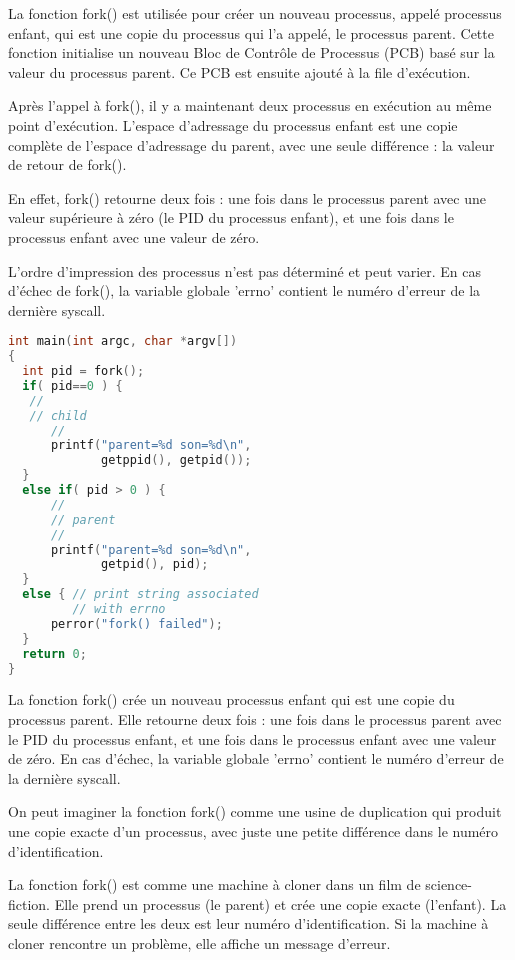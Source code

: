 \documentclass[12pt]{report}
\begin{document}
 La fonction fork() est utilisée pour créer un nouveau processus, appelé processus enfant, qui est une copie du processus qui l'a appelé, le processus parent. Cette fonction initialise un nouveau Bloc de Contrôle de Processus (PCB) basé sur la valeur du processus parent. Ce PCB est ensuite ajouté à la file d'exécution. 

 Après l'appel à fork(), il y a maintenant deux processus en exécution au même point d'exécution. L'espace d'adressage du processus enfant est une copie complète de l'espace d'adressage du parent, avec une seule différence : la valeur de retour de fork(). 

 En effet, fork() retourne deux fois : une fois dans le processus parent avec une valeur supérieure à zéro (le PID du processus enfant), et une fois dans le processus enfant avec une valeur de zéro. 

 L'ordre d'impression des processus n'est pas déterminé et peut varier. En cas d'échec de fork(), la variable globale 'errno' contient le numéro d'erreur de la dernière syscall. 


\begin{lstlisting}[language=C]
int main(int argc, char *argv[])
{
  int pid = fork();
  if( pid==0 ) { 
   //
   // child
      //
      printf("parent=%d son=%d\n",
             getppid(), getpid());
  }
  else if( pid > 0 ) {
      //
      // parent
      //
      printf("parent=%d son=%d\n",
             getpid(), pid);
  }
  else { // print string associated
         // with errno   
      perror("fork() failed"); 
  }
  return 0;
}
\end{lstlisting}

\begin{tcolorbox}[colback=yellow!5, colframe=yellow!80!black, title={\faBookmark À retenir}]
La fonction fork() crée un nouveau processus enfant qui est une copie du processus parent. Elle retourne deux fois : une fois dans le processus parent avec le PID du processus enfant, et une fois dans le processus enfant avec une valeur de zéro. En cas d'échec, la variable globale 'errno' contient le numéro d'erreur de la dernière syscall.
\end{tcolorbox}

\begin{tcolorbox}[colback=green!5, colframe=green!75!black, title={\faLightbulb Intuition}]
On peut imaginer la fonction fork() comme une usine de duplication qui produit une copie exacte d'un processus, avec juste une petite différence dans le numéro d'identification.
\end{tcolorbox}

\begin{tcolorbox}[colback=blue!5, colframe=blue!75!black, title={\faLightbulb Vulgarisation simple}]
La fonction fork() est comme une machine à cloner dans un film de science-fiction. Elle prend un processus (le parent) et crée une copie exacte (l'enfant). La seule différence entre les deux est leur numéro d'identification. Si la machine à cloner rencontre un problème, elle affiche un message d'erreur.
\end{tcolorbox}
\end{document}
